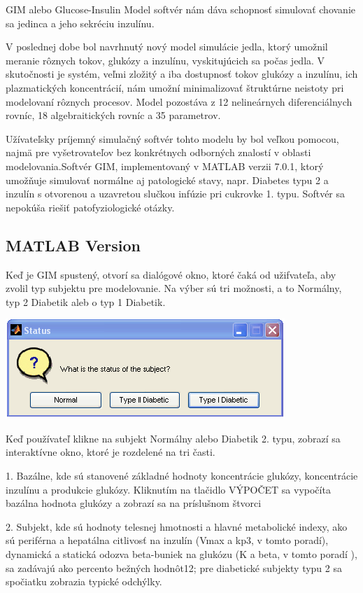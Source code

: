 
GIM alebo Glucose-Insulin Model softvér nám dáva schopnosť simulovať chovanie sa jedinca a jeho sekréciu inzulínu.

V poslednej dobe bol navrhnutý nový model simulácie jedla, ktorý umožnil meranie rôznych tokov, glukózy a inzulínu, vyskitujúcich sa počas jedla. V skutočnosti je systém, veľmi zložitý a iba dostupnosť tokov glukózy a inzulínu, ich plazmatických koncentrácií, nám umožní minimalizovať štruktúrne neistoty pri modelovaní rôznych procesov. Model pozostáva z 12 nelineárnych diferenciálnych rovníc, 18 algebraitických rovníc a 35 parametrov.

 Užívateľsky príjemný simulačný softvér tohto modelu by bol veľkou pomocou, najmä pre vyšetrovateľov bez konkrétnych odborných znalostí v oblasti modelovania.Softvér GIM, implementovaný v MATLAB verzii 7.0.1, ktorý umožňuje simulovať normálne aj patologické stavy, napr. Diabetes typu 2 a inzulín s otvorenou a uzavretou slučkou infúzie pri cukrovke 1. typu. Softvér sa nepokúša riešiť patofyziologické otázky.

\subsection{MATLAB Version}

Keď je GIM spustený, otvorí sa dialógové okno, ktoré čaká od užifvateľa, aby zvolil typ subjektu pre modelovanie. Na výber sú tri možnosti, a to Normálny, typ 2 Diabetik aleb o typ 1 Diabetik.

\includegraphics[scale=0.5]{ob-1.PNG}

Keď používateľ klikne na subjekt Normálny alebo Diabetik 2. typu, zobrazí sa interaktívne okno, ktoré je rozdelené na tri časti. 

1. Bazálne, kde sú stanovené základné hodnoty koncentrácie glukózy, koncentrácie inzulínu a produkcie glukózy. Kliknutím na tlačidlo VÝPOČET sa vypočíta bazálna hodnota glukózy a zobrazí sa na príslušnom štvorci 

2. Subjekt, kde sú hodnoty telesnej hmotnosti a hlavné metabolické indexy, ako sú periférna a hepatálna citlivosť na inzulín (Vmax a kp3, v tomto poradí), dynamická a statická odozva beta-buniek na glukózu (K a beta, v tomto poradí ), sa zadávajú ako percento bežných hodnôt12; pre diabetické subjekty typu 2 sa spočiatku zobrazia typické odchýlky. 

